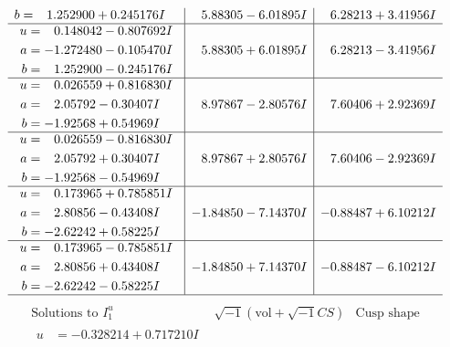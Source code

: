 \documentclass[1p]{elsarticle_modified}
\theoremstyle{definition}
\newcommand{\I}{\sqrt{-1}}
\begin{document}
$$\begin{array}{c|c|c}
\begin{aligned}
b &= \phantom{-}1.252900 + 0.245176 I\end{aligned}
 & \phantom{-}5.88305 - 6.01895 I & \phantom{-}6.28213 + 3.41956 I \\ \hline\begin{aligned}
u &= \phantom{-}0.148042 - 0.807692 I \\
a &= -1.272480 - 0.105470 I \\
b &= \phantom{-}1.252900 - 0.245176 I\end{aligned}
 & \phantom{-}5.88305 + 6.01895 I & \phantom{-}6.28213 - 3.41956 I \\ \hline\begin{aligned}
u &= \phantom{-}0.026559 + 0.816830 I \\
a &= \phantom{-}2.05792 - 0.30407 I \\
b &= -1.92568 + 0.54969 I\end{aligned}
 & \phantom{-}8.97867 - 2.80576 I & \phantom{-}7.60406 + 2.92369 I \\ \hline\begin{aligned}
u &= \phantom{-}0.026559 - 0.816830 I \\
a &= \phantom{-}2.05792 + 0.30407 I \\
b &= -1.92568 - 0.54969 I\end{aligned}
 & \phantom{-}8.97867 + 2.80576 I & \phantom{-}7.60406 - 2.92369 I \\ \hline\begin{aligned}
u &= \phantom{-}0.173965 + 0.785851 I \\
a &= \phantom{-}2.80856 - 0.43408 I \\
b &= -2.62242 + 0.58225 I\end{aligned}
 & -1.84850 - 7.14370 I & -0.88487 + 6.10212 I \\ \hline\begin{aligned}
u &= \phantom{-}0.173965 - 0.785851 I \\
a &= \phantom{-}2.80856 + 0.43408 I \\
b &= -2.62242 - 0.58225 I\end{aligned}
 & -1.84850 + 7.14370 I & -0.88487 - 6.10212 I\\
 \hline 
 \end{array}$$\newpage$$\begin{array}{c|c|c}  
\text{Solutions to }I^u_{1}& \I (\text{vol} + \sqrt{-1}CS) & \text{Cusp shape}\\
 \hline 
\begin{aligned}
u &= -0.328214 + 0.717210 I \\

\end{aligned}
\end{array}$$
\end{document}
